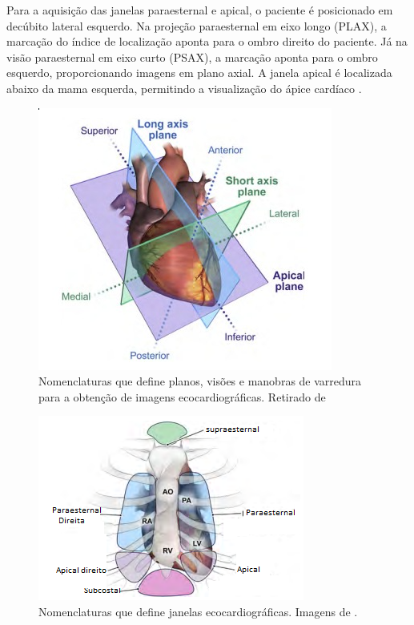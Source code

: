 Para a aquisição das janelas paraesternal e apical, o paciente é posicionado em decúbito lateral esquerdo. Na projeção paraesternal em eixo longo (PLAX), a marcação do índice de localização aponta para o ombro direito do paciente. Já na visão paraesternal em eixo curto (PSAX), a marcação aponta para o ombro esquerdo, proporcionando imagens em plano axial. A janela apical é localizada abaixo da mama esquerda, permitindo a visualização do ápice cardíaco\cite{Mitchell2019-br} .

 
 \begin{figure}[H]
   \centering
   \includegraphics[width=0.6\linewidth]{capitulos/figuras/planos.png}
   \caption{Nomenclaturas que define planos, visões e manobras de varredura para a obtenção de imagens ecocardiográficas. Retirado de \textcite{Mitchell2019-br}}
   \label{fig:planos}
\end{figure}

 \begin{figure}[H]
   \centering
   \includegraphics[width=0.6\linewidth]{capitulos/figuras/planos2.png}
   \caption{Nomenclaturas que define janelas ecocardiográficas. Imagens de \textcite{Mitchell2019-br}.}
   \label{fig:planos2}
\end{figure}


